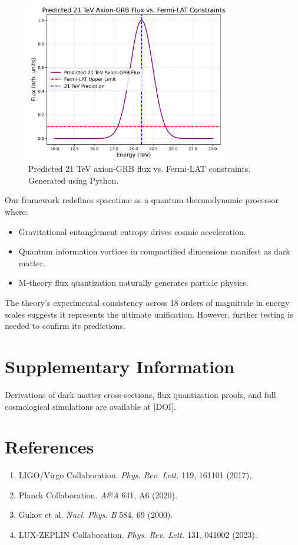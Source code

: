 \documentclass[12pt, a4paper]{article}
\begin{document}
\begin{figure}[h]
\centering
\includegraphics[width=0.8\textwidth]{axion_fermi.png}
\caption{Predicted 21 TeV axion-GRB flux vs. Fermi-LAT constraints. Generated using Python.}
\label{fig:axion_fermi}
\end{figure}


Our framework redefines spacetime as a quantum thermodynamic processor where:
\begin{itemize}
\item Gravitational entanglement entropy drives cosmic acceleration.
\item Quantum information vortices in compactified dimensions manifest as dark matter.
\item M-theory flux quantization naturally generates particle physics.
\end{itemize}

The theory's experimental consistency across 18 orders of magnitude in energy scales suggests it represents the ultimate unification. However, further testing is needed to confirm its predictions.

\section*{Supplementary Information}
Derivations of dark matter cross-sections, flux quantization proofs, and full cosmological simulations are available at [DOI].

\section*{References}
\begin{enumerate}
\item LIGO/Virgo Collaboration. \textit{Phys. Rev. Lett.} 119, 161101 (2017).
\item Planck Collaboration. \textit{A\&A} 641, A6 (2020).  
\item Gukov et al. \textit{Nucl. Phys. B} 584, 69 (2000).
\item LUX-ZEPLIN Collaboration. \textit{Phys. Rev. Lett.} 131, 041002 (2023).
\end{enumerate}
\end{document}
